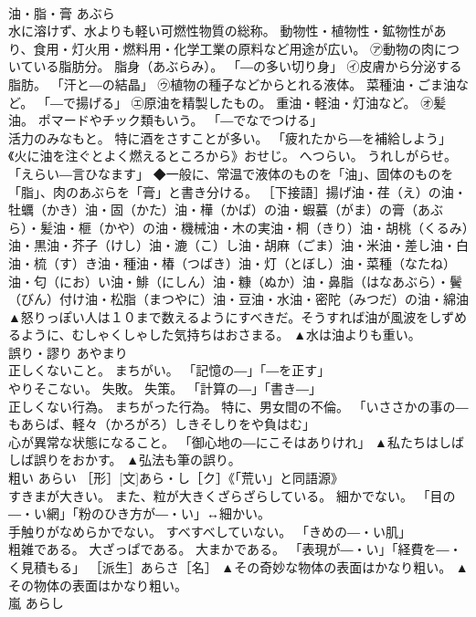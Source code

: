 \documentclass[8pt]{extreport}
\begin{document}
\begin{CJK}{UTF8}{min}
\\	油・脂・膏	あぶら	
\\	水に溶けず、水よりも軽い可燃性物質の総称。 動物性・植物性・鉱物性があり、食用・灯火用・燃料用・化学工業の原料など用途が広い。 ㋐動物の肉についている脂肪分。 脂身（あぶらみ）。 「―の多い切り身」 ㋑皮膚から分泌する脂肪。 「汗と―の結晶」 ㋒植物の種子などからとれる液体。 菜種油・ごま油など。 「―で揚げる」 ㋓原油を精製したもの。 重油・軽油・灯油など。 ㋔髪油。 ポマードやチック類もいう。 「―でなでつける」 
\\	活力のみなもと。 特に酒をさすことが多い。 「疲れたから―を補給しよう」 
\\	《火に油を注ぐとよく燃えるところから》おせじ。 へつらい。 うれしがらせ。 「えらい―言ひなます」 ◆一般に、常温で液体のものを「油」、固体のものを「脂」、肉のあぶらを「膏」と書き分ける。 ［下接語］揚げ油・荏（え）の油・牡蠣（かき）油・固（かた）油・樺（かば）の油・蝦蟇（がま）の膏（あぶら）・髪油・榧（かや）の油・機械油・木の実油・桐（きり）油・胡桃（くるみ）油・黒油・芥子（けし）油・漉（こ）し油・胡麻（ごま）油・米油・差し油・白油・梳（す）き油・種油・椿（つばき）油・灯（とぼし）油・菜種（なたね）油・匂（にお）い油・鯡（にしん）油・糠（ぬか）油・鼻脂（はなあぶら）・鬢（びん）付け油・松脂（まつやに）油・豆油・水油・密陀（みつだ）の油・綿油	▲怒りっぽい人は１０まで数えるようにすべきだ。そうすれば油が風波をしずめるように、むしゃくしゃした気持ちはおさまる。 ▲水は油よりも重い。
\\	誤り・謬り	あやまり	
\\	正しくないこと。 まちがい。 「記憶の―」「―を正す」 
\\	やりそこない。 失敗。 失策。 「計算の―」「書き―」 
\\	正しくない行為。 まちがった行為。 特に、男女間の不倫。 「いささかの事の―もあらば、軽々（かろがろ）しきそしりをや負はむ」 
\\	心が異常な状態になること。 「御心地の―にこそはありけれ」	▲私たちはしばしば誤りをおかす。 ▲弘法も筆の誤り。
\\	粗い	あらい	［形］[文]あら・し［ク］《「荒い」と同語源》 
\\	すきまが大きい。 また、粒が大きくざらざらしている。 細かでない。 「目の―・い網」「粉のひき方が―・い」↔細かい。 
\\	手触りがなめらかでない。 すべすべしていない。 「きめの―・い肌」 
\\	粗雑である。 大ざっぱである。 大まかである。 「表現が―・い」「経費を―・く見積もる」 ［派生］あらさ［名］	▲その奇妙な物体の表面はかなり粗い。 ▲その物体の表面はかなり粗い。
\\	嵐	あらし	

\end{CJK}
\end{document}
